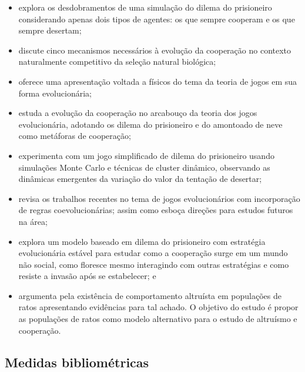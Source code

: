 \begin{itemize}
    \item  \cite{nowak_evolutionary_1992} explora os desdobramentos de uma simulação do dilema do prisioneiro considerando apenas dois tipos de agentes: os que sempre cooperam e os que sempre desertam;
    \item  \cite{nowak_five_2006} discute cinco mecanismos necessários à evolução da cooperação no contexto naturalmente competitivo da seleção natural biológica; 
    \item \cite{szabo_evolutionary_2006} oferece uma apresentação voltada a físicos do tema da teoria de jogos em sua forma evolucionária;
    \item \cite{santos_scale-free_2005} estuda a evolução da cooperação no arcabouço da teoria dos jogos evolucionária, adotando os dilema do prisioneiro e do amontoado de neve como metáforas de cooperação;
    \item \cite{szabo_evolutionary_1998} experimenta com um jogo simplificado de dilema do prisioneiro usando simulações Monte Carlo e técnicas de cluster dinâmico, observando as dinâmicas emergentes da variação do valor da tentação de desertar;
    \item \cite{perc_coevolutionary_2009} revisa os trabalhos recentes no tema de jogos evolucionários com incorporação de regras coevolucionárias; assim como esboça direções para estudos futuros na área;
    \item \cite{greene_review_1984} explora um modelo baseado em dilema do prisioneiro com estratégia evolucionária estável para estudar como a cooperação surge em um mundo não social, como floresce mesmo interagindo com outras estratégias e como resiste a invasão após se estabelecer; e
    \item \cite{trivers_evolution_1971} argumenta pela existência de comportamento altruísta em populações de ratos apresentando evidências para tal achado. O objetivo do estudo é propor as populações de ratos como modelo alternativo para o estudo de altruísmo e cooperação.
\end{itemize}

\subsection{Medidas bibliométricas}

